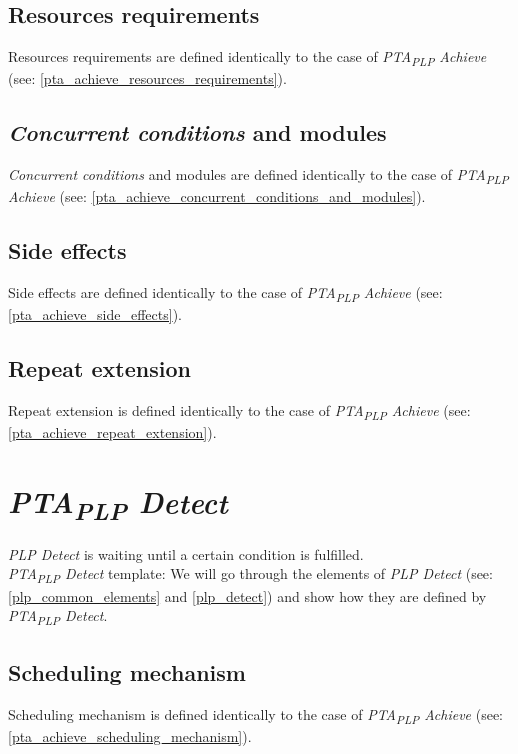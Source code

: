 \subsection{Resources requirements}
Resources requirements are defined identically to the case of \textit{PTA\textsubscript{PLP} Achieve}  (see: \ref{pta_achieve_resources_requirements}).\\
\subsection{\textit{Concurrent conditions} and modules}
\textit{Concurrent conditions} and modules are defined identically to the case of \textit{PTA\textsubscript{PLP} Achieve}  (see: \ref{pta_achieve_concurrent_conditions_and_modules}).\\
\subsection{Side effects}
Side effects are defined identically to the case of \textit{PTA\textsubscript{PLP} Achieve}  (see: \ref{pta_achieve_side_effects}). \\
\subsection{Repeat extension}
Repeat extension is defined identically to the case of \textit{PTA\textsubscript{PLP} Achieve} (see: \ref{pta_achieve_repeat_extension}).\\
\clearpage
\section{\textit{PTA\textsubscript{PLP} Detect}}
\textit{PLP Detect} is waiting until a certain condition is fulfilled. \\
\textit{PTA\textsubscript{PLP} Detect} template:  We will go through the elements of \textit{PLP Detect} (see: \ref{plp_common_elements} and \ref{plp_detect}) and show how they are defined by \textit{PTA\textsubscript{PLP} Detect}.\\
\subsection{Scheduling mechanism}
Scheduling mechanism is defined identically to the case of \textit{PTA\textsubscript{PLP} Achieve}  (see: \ref{pta_achieve_scheduling_mechanism}).\\
